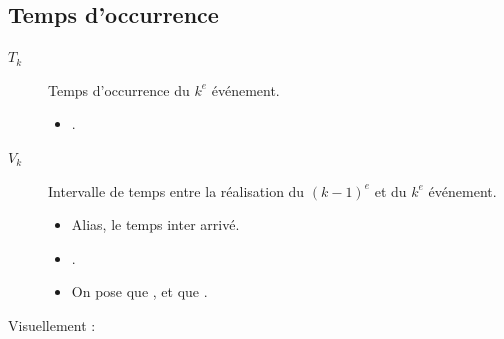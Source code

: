 \documentclass[french]{article}
\begin{document}
\begin{multicols*}{2}
\subsection{Temps d'occurrence}\label{subsec:ProcPoisTempsOccur}
\begin{distributions}[Notation]
\begin{description}
	\item[$T_{k}$]	Temps d'occurrence du $k^{e}$ événement.
		\begin{itemize}
		\item	{}.
		\end{itemize}
	\item[$V_{k}$]	Intervalle de temps entre la réalisation du $(k - 1)^{e}$ et du $k^{e}$ événement.
		\begin{itemize}
		\item	Alias, le temps inter arrivé.
		\item	{}.
		\item	On pose que ,  et que .
		\end{itemize}
\end{description}
\end{distributions}

Visuellement : 
\begin{center}
\begin{tikzpicture}[x=0.75pt,y=0.75pt,yscale=-1,xscale=1]


\end{tikzpicture}
\end{center}
\end{multicols*}
\end{document}
